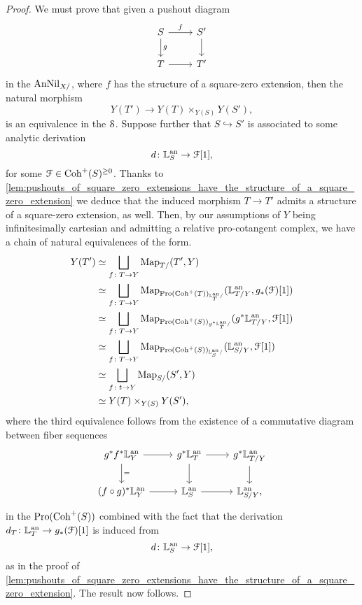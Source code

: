 \documentclass[10pt,a4paper,reqno]{amsart} %
\theoremstyle{plain}
\theoremstyle{definition}
\theoremstyle{remark}
\numberwithin{equation}{section}
\begin{document}
\begin{proof}
    We must prove that given a pushout diagram
        \[
        \begin{tikzcd}
            S \ar{r}{f} \ar{d}{g} & S' \ar{d} \\
            T \ar{r} & T'  
        \end{tikzcd}
        \]
    in the \infcat $\mathrm{AnNil}_{X/}$, where $f$ has the structure of a square-zero extension, then the natural morphism
        \[
            Y(T') \to Y(T) \times_{Y(S)} Y(S'),  
        \]
    is an equivalence in the \infcat $\mathcal S$. Suppose further that $S \hookrightarrow S'$ is associated to some analytic derivation
        \[
            d \colon \mathbb L^\mathrm{an}_S \to \mathcal F[1],
        \]
    for some $\mathcal F \in \mathrm{Coh}^+(S)^{\ge 0}$.
    Thanks to \cref{lem:pushouts_of_square_zero_extensions_have_the_structure_of_a_square_zero_extension} we deduce
    that the induced morphism $T \to T'$ admits a structure of a square-zero extension, as well.
    Then, by our assumptions of $Y$ being infinitesimally cartesian and admitting a relative pro-cotangent complex, we have a chain of natural equivalences of the form.
        \begin{align*}
            Y(T') & \simeq \bigsqcup_{f \colon T \to Y} \operatorname{Map}_{T/ }(T', Y) \\
                  & \simeq \bigsqcup_{f \colon T \to Y} \operatorname{Map}_{\mathrm{Pro}(\mathrm{Coh}^+(T))_{\mathbb L^\mathrm{an}_T/ }}(\mathbb L^\mathrm{an}_{T/ Y}, g_*(\mathcal F)[1]) \\
                  & \simeq \bigsqcup_{f \colon T \to Y} \operatorname{Map}_{\mathrm{Pro}(\mathrm{Coh}^+(S))_{g^* \mathbb L^\mathrm{an}_T/ }}(g^* \mathbb L^\mathrm{an}_{T/ Y}, \mathcal F[1]) \\
                  & \simeq \bigsqcup_{f \colon T \to Y} \operatorname{Map}_{\mathrm{Pro}(\mathrm{Coh}^+(S))_{\mathbb L^\mathrm{an}_S/ }}(\mathbb L^\mathrm{an}_{S/ Y}, \mathcal F[1]) \\
                  & \simeq \bigsqcup_{f \colon t \to Y} \operatorname{Map}_{S/ }(S', Y) \\
                  & \simeq Y(T) \times_{Y(S)} Y(S'),
        \end{align*}
    where the third equivalence follows from the existence of a commutative diagram between fiber sequences
        \[
        \begin{tikzcd}    
            g^* f^*\bbL\an_Y \ar{r} \ar{d}{=} & g^* \bbL\an_{T} \ar{r} \ar{d} &  g^* \bbL\an_{T/Y} \ar{d} \\
            (f\circ g)^*\bbL\an_Y \ar{r} & \bbL\an_{S} \ar{r} & \bbL\an_{S/Y},
        \end{tikzcd}
        \]
    in the \infcat $\mathrm{Pro}(\mathrm{Coh}^+(S))$ combined with the fact that the derivation $d_T \colon \mathbb L^\mathrm{an}_T \to g_*(\mathcal F)[1]$ is induced from
        \[
            d \colon \mathbb L^\mathrm{an}_S \to \mathcal F[1],
        \]
    as in the proof of \cref{lem:pushouts_of_square_zero_extensions_have_the_structure_of_a_square_zero_extension}. The result now follows.
\end{proof}
\end{document}
